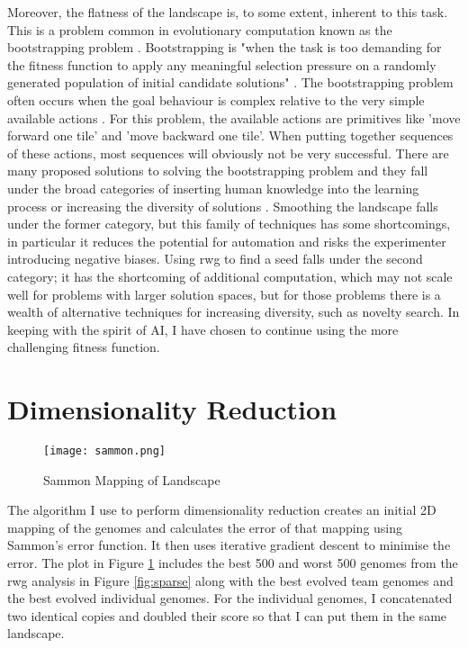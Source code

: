 \documentclass[12pt]{article}
\begin{document}
Moreover, the flatness of the landscape is, to some extent, inherent to this task.
This is a problem common in evolutionary computation known as the bootstrapping problem \cite{Silva:EC:2016, Wei:ALR:2019}.
Bootstrapping is "when the task is too demanding for the fitness function to apply any meaningful selection pressure on a randomly generated population of initial candidate solutions" \cite{Silva:EC:2016}.
The bootstrapping problem often occurs when the goal behaviour is complex relative to the very simple available actions \cite{Wei:ALR:2019}.
For this problem, the available actions are primitives like 'move forward one tile' and 'move backward one tile'.
When putting together sequences of these actions, most sequences will obviously not be very successful.
There are many proposed solutions to solving the bootstrapping problem and they fall under the broad categories of inserting human knowledge into the learning process or increasing the diversity of solutions \cite{Silva:EC:2016}.
Smoothing the landscape falls under the former category, but this family of techniques has some shortcomings, in particular it reduces the potential for automation and risks the experimenter introducing negative biases.
Using rwg to find a seed falls under the second category; it has the shortcoming of additional computation, which may not scale well for problems with larger solution spaces, but for those problems there is a wealth of alternative techniques for increasing diversity, such as novelty search.
In keeping with the spirit of AI, I have chosen to continue using the more challenging fitness function.

\section{Dimensionality Reduction}\label{sammon}

\begin{figure}[h]
\centering
\texttt{[image: sammon.png]}
\caption{Sammon Mapping of Landscape}
\label{fig:sammon}
\end{figure}

The algorithm I use to perform dimensionality reduction creates an initial 2D mapping of the genomes and calculates the error of that mapping using Sammon's error function. 
It then uses iterative gradient descent to minimise the error. 
The plot in Figure \ref{fig:sammon} includes the best 500 and worst 500 genomes from the rwg analysis in Figure \ref{fig:sparse} along with the best evolved team genomes and the best evolved individual genomes. 
For the individual genomes, I concatenated two identical copies and doubled their score so that I can put them in the same landscape.\\
\end{document}
